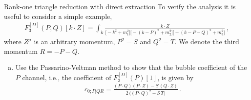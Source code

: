 \begin{exer}{Rank-one triangle reduction with direct extraction}
\label{Ex:3.DirectExtraction}
%
To verify the analysis it is useful to consider a simple example,
\begin{align}
  F_3^{[D]}(P,Q)[k\cdot Z] = \int_k \frac{k\cdot Z}{
  \bigl[-k^2+m_1^2\bigr]\bigl[-(k-P)^2+m_2^2 \bigr] \bigl[-(k-P-Q)^2+m_3^2 \bigr]} \,,
\end{align}
where $Z^{\mu}$ is an arbitrary momentum, $P^2=S$ and $Q^2=T$. We denote the third momentum $R=-P-Q$.

\begin{enumerate}[a)]
\item Use the Passarino-Veltman method to show that the bubble coefficient of the $P$ channel, i.e., the coefficient of $F_2^{[D]}(P)[1]$, is given by
\begin{align}
  c_{0;P|QR} = \frac{(P\cdot Q) (P\cdot Z) - S \, (Q\cdot Z)}{2 \, \bigl( (P\cdot Q)^2 - S \, T \bigr)} \,.
\end{align}


\end{enumerate}
\end{exer}
